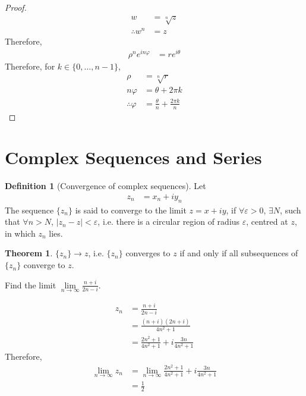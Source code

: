 \documentclass[fleqn, a4paper, 12pt, twoside]{article}
\theoremstyle{definition}
\newtheorem{definition}{Definition}
\theoremstyle{theorem}
\newtheorem{theorem}{Theorem}
\begin{document}
\begin{proof}
	\begin{align*}
		w              & = \sqrt[n]{z} \\
		\therefore w^n & = z
	\end{align*}
	Therefore,
	\begin{align*}
		\rho^n e^{i n \varphi} & = r e^{i \theta}
	\end{align*}
	Therefore, for $k \in \{0,\dots,n - 1\}$,
	\begin{align*}
		\rho               & = \sqrt[n]{r}      \\
		n \varphi          & = \theta + 2 \pi k \\
		\therefore \varphi & = \frac{\theta}{n} + \frac{2 \pi k}{n}
	\end{align*}
\end{proof}

\newpage
\part{Complex Sequences and Series}

\begin{definition}[Convergence of complex sequences]
	Let
	\begin{align*}
		z_n & = x_n + i y_n
	\end{align*}
	The sequence $\{z_n\}$ is said to converge to the limit $z = x + i y$, if $\forall \varepsilon > 0$, $\exists N$, such that $\forall n > N$, $|z_n - z| < \varepsilon$, i.e. there is a circular region of radius $\varepsilon$, centred at $z$, in which $z_n$ lies.
\end{definition}

\begin{theorem}
	$\{z_n\} \to z$, i.e. $\{z_n\}$ converges to $z$ if and only if all subsequences of $\{z_n\}$ converge to $z$.
\end{theorem}

\begin{question}
	Find the limit $\lim\limits_{n \to \infty} \frac{n + i}{2 n - i}$.
\end{question}

\begin{solution}
	\begin{align*}
		z_n & = \frac{n + i}{2 n - i}               \\
                    & = \frac{(n + i) (2 n + i)}{4 n^2 + 1} \\
                    & = \frac{2 n^2 + 1}{4 n^2 + 1} + i \frac{3 n}{4 n^2 + 1}
	\end{align*}
	Therefore,
	\begin{align*}
		\lim\limits_{n \to \infty} z_n & = \lim\limits_{n \to \infty} \frac{2 n^2 + 1}{4 n^2 + 1} + i \frac{3 n}{4 n^2 + 1} \\
                                               & = \frac{1}{2}
	\end{align*}
\end{solution}
\end{document}
